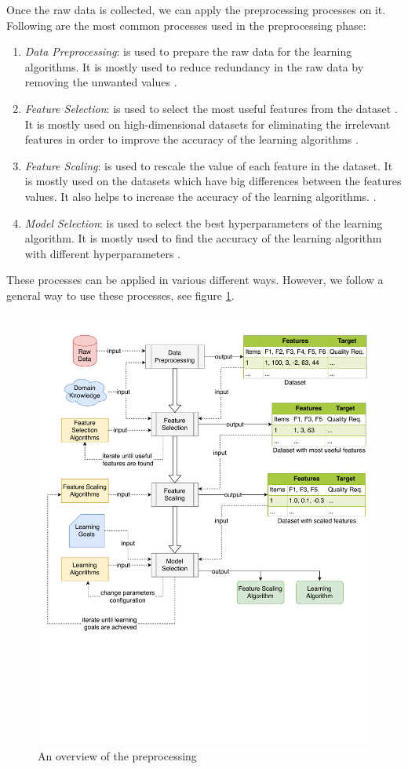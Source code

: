 \documentclass[a4paper,12pt]{article}
\begin{document}
Once the raw data is collected, we can apply the preprocessing processes on it. Following are the most common processes used in the preprocessing phase:
\begin{enumerate}
	\item \emph{Data Preprocessing}: is used to prepare the raw data for the learning algorithms. It is mostly used to reduce redundancy in the raw data by removing the unwanted values \cite{HOMLWSLATF-2017}.
	\item \emph{Feature Selection}: is used to select the most useful features from the dataset \cite{HOMLWSLATF-2017}. It is mostly used on high-dimensional datasets for eliminating the irrelevant features in order to improve the accuracy of the learning algorithms \cite{SLMLIP-2011}.
	\item \emph{Feature Scaling}: is used to rescale the value of each feature in the dataset. It is mostly used on the datasets which have big differences between the features values. It also helps to increase the accuracy of the learning algorithms. \cite{HOMLWSLATF-2017}.
	\item \emph{Model Selection}: is used to select the best hyperparameters of the learning algorithm.  It is mostly used to find the accuracy of the learning algorithm with different hyperparameters \cite{LSLMLIP-2013}.
\end{enumerate}
These processes can be applied in various different ways. However, we follow a general way to use these processes, see figure \ref{Preprocessing}.
\begin{figure}[H]
	\centering
	\includegraphics[keepaspectratio, width=\linewidth]{figures/Preprocessing.pdf}
	\caption{An overview of the preprocessing}
	\label{Preprocessing}
\end{figure}
\end{document}
